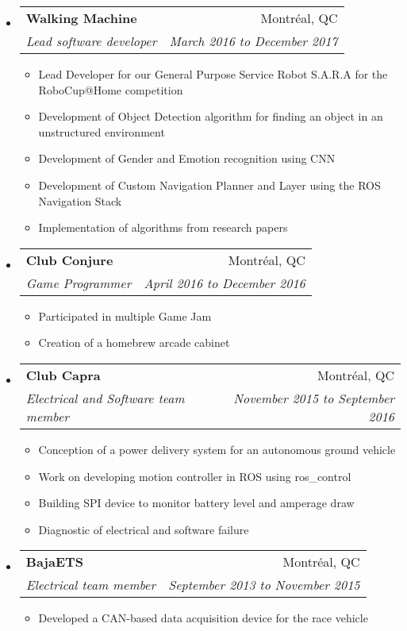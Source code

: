 \documentclass[letterpaper,11pt]{article}
\makeatletter
\newcommand{\ressubheading}[4]{
	\begin{tabular*}{6.5in}{l@{\cftdotfill{\cftsecdotsep}\extracolsep{\fill}}r}
		\textbf{#1} & #2 \\
		\textit{#3} & \textit{#4} \\
	\end{tabular*}\vspace{-6pt}}
\makeatother
\begin{document}
	\begin{itemize}
		\item 
		\ressubheading{Walking Machine}{Montréal, QC}{Lead software developer}{March 2016 to December 2017}
		\begin{itemize}
			\item Lead Developer for our General Purpose Service Robot S.A.R.A for the RoboCup@Home competition
			\item Development of Object Detection algorithm for finding an object in an unstructured environment
			\item Development of Gender and Emotion recognition using CNN
			\item Development of Custom Navigation Planner and Layer using the ROS Navigation Stack
			\item Implementation of algorithms from research papers
		\end{itemize}
		
		\item
		\ressubheading{Club Conjure}{Montréal, QC}{Game Programmer}{April 2016 to December 2016}
		\begin{itemize}
			\item Participated in multiple Game Jam
			\item Creation of a homebrew arcade cabinet
		\end{itemize}
		\item
		\ressubheading{Club Capra}{Montréal, QC}{Electrical and Software team member}{November 2015 to September 2016}
		\begin{itemize}
			\item Conception of a power delivery system for an autonomous ground vehicle
			\item Work on developing motion controller in ROS using ros\_control
			\item Building SPI device to monitor battery level and amperage draw
			\item Diagnostic of electrical and software failure
		\end{itemize}
		
		\item
		\ressubheading{BajaETS}{Montréal, QC}{Electrical team member}{September 2013 to November 2015}
		\begin{itemize}
			\item Developed a CAN-based data acquisition device for the race vehicle
		\end{itemize}
		
	\end{itemize}
	
\end{document}
